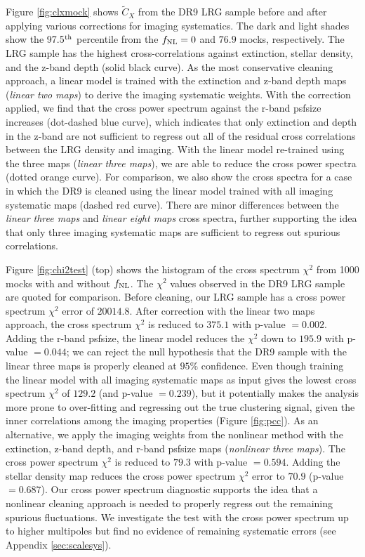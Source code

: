 Figure \ref{fig:clxmock} shows $\tilde{C}_{X}$ from the DR9 LRG sample before and after applying various corrections for imaging systematics. The dark and light shades show the 97.5$^{\rm th}$ percentile from the $f_{\rm NL}=0$ and $76.9$ mocks, respectively. The LRG sample has the highest cross-correlations against extinction, stellar density, and the z-band depth (solid black curve). As the most conservative cleaning approach, a linear model is trained with the extinction and z-band depth maps (\textit{linear two maps}) to derive the imaging systematic weights. With the correction applied, we find that the cross power spectrum against the r-band psfsize increases (dot-dashed blue curve), which indicates that only extinction and depth in the z-band are not sufficient to regress out all of the residual cross correlations between the LRG density and imaging. With the linear model re-trained using the three maps (\textit{linear three maps}), we are able to reduce the cross power spectra (dotted orange curve). For comparison, we also show the cross spectra for a case in which the DR9 is cleaned using the linear model trained with all imaging systematic maps (dashed red curve). There are minor differences between the \textit{linear three maps} and \textit{linear eight maps} cross spectra, further supporting the idea that only three imaging systematic maps are sufficient to regress out spurious correlations.

Figure \ref{fig:chi2test} (top)  shows the histogram of the cross spectrum $\chi^{2}$ from 1000 mocks with and without $f_{\rm NL}$. The $\chi^{2}$ values observed in the DR9 LRG sample are quoted for comparison. Before cleaning, our LRG sample has a cross power spectrum $\chi^{2}$ error of $20014.8$. After correction with the linear two maps approach, the cross spectrum $\chi^{2}$ is reduced to $375.1$ with p-value $=0.002$. Adding the r-band psfsize, the linear model reduces the $\chi^{2}$ down to $195.9$ with p-value $=0.044$; we can reject the null hypothesis that the DR9 sample with the linear three maps is properly cleaned at $95\%$ confidence. Even though training the linear model with all imaging systematic maps as input gives the lowest cross spectrum $\chi^{2}$ of $129.2$ (and p-value $=0.239$), but it potentially makes the analysis more prone to over-fitting and regressing out the true clustering signal, given the inner correlations among the imaging properties (Figure \ref{fig:pcc}). As an alternative, we apply the imaging weights from the nonlinear method with the extinction, z-band depth, and r-band psfsize maps (\textit{nonlinear three maps}). The cross power spectrum $\chi^{2}$ is reduced to $79.3$ with p-value $=0.594$.  Adding the stellar density map reduces the cross power spectrum $\chi^{2}$ error to $70.9$ (p-value $=0.687$). Our cross power spectrum diagnostic supports the idea that a nonlinear cleaning approach is needed to properly regress out the remaining spurious fluctuations. We investigate the test with the cross power spectrum up to higher multipoles but find no evidence of remaining systematic errors (see Appendix \ref{sec:scalesys}). 

